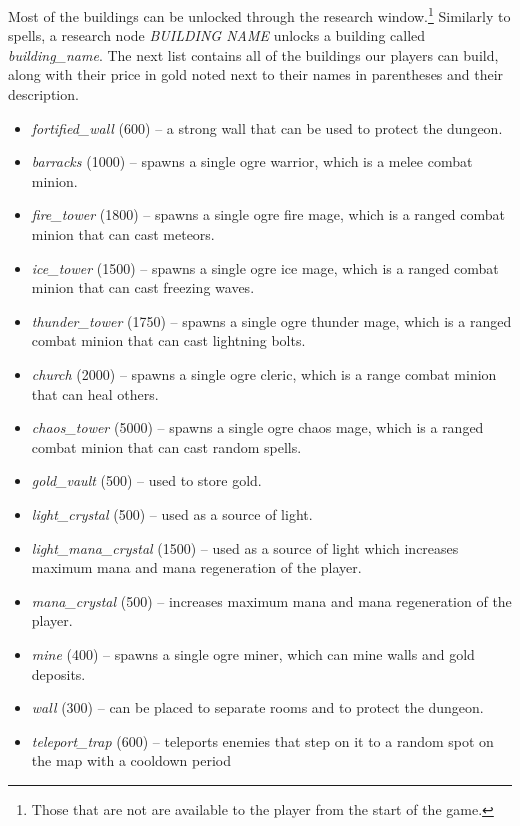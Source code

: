 Most of the buildings can be unlocked through the research window.\footnote{Those that are not are available to the player from the start of
the game.} Similarly to spells, a research node \emph{BUILDING NAME} unlocks a
building called \emph{building\_name}. The next list contains all of the buildings our players can build, along with their price
in gold noted next to their names in parentheses and their description.

\begin{itemize}
    \item \emph{fortified\_wall} (600) -- a strong wall that can be used to protect the dungeon.
    \item \emph{barracks} (1000) -- spawns a single ogre warrior, which is a melee combat minion.
    \item \emph{fire\_tower} (1800) -- spawns a single ogre fire mage, which is a ranged combat minion that can cast meteors.
    \item \emph{ice\_tower} (1500) -- spawns a single ogre ice mage, which is a ranged combat minion that can cast freezing waves.
    \item \emph{thunder\_tower} (1750) -- spawns a single ogre thunder mage, which is a ranged combat minion that can cast lightning bolts.
    \item \emph{church} (2000) -- spawns a single ogre cleric, which is a range combat minion that can heal others.
    \item \emph{chaos\_tower} (5000) -- spawns a single ogre chaos mage, which is a ranged combat minion that can cast random spells.
    \item \emph{gold\_vault} (500) -- used to store gold.
    \item \emph{light\_crystal} (500) -- used as a source of light.
    \item \emph{light\_mana\_crystal} (1500) -- used as a source of light which increases maximum mana and mana regeneration of the
        player.
    \item \emph{mana\_crystal} (500) -- increases maximum mana and mana regeneration of the player.
    \item \emph{mine} (400) -- spawns a single ogre miner, which can mine walls and gold deposits.
    \item \emph{wall} (300) -- can be placed to separate rooms and to protect the dungeon.
    \item \emph{teleport\_trap} (600) -- teleports enemies that step on it to a random spot on the map with a cooldown period

\end{itemize}

